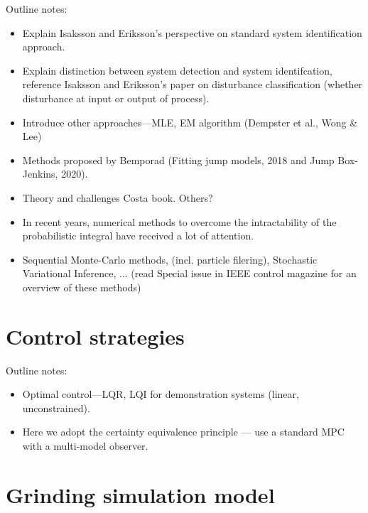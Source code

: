Outline notes:
\begin{itemize}
	\item Explain Isaksson and Eriksson's perspective on standard system identification approach.
	\item Explain distinction between system detection and system identifcation, reference Isaksson and Eriksson's paper on disturbance classification (whether disturbance at input or output of process).
	\item Introduce other approaches—MLE, EM algorithm (Dempster et al., Wong \& Lee)
	\item Methods proposed by Bemporad (Fitting jump models, 2018 and Jump Box-Jenkins, 2020).
	\item Theory and challenges Costa book. Others?
	\item In recent years, numerical methods to overcome the intractability of the probabilistic integral have received a lot of attention.
	\item Sequential Monte-Carlo methods, (incl. particle filering), Stochastic Variational Inference, ... (read Special issue in IEEE control magazine for an overview of these methods)
\end{itemize}


\section{Control strategies}

Outline notes:
\begin{itemize}
	\item Optimal control—LQR, LQI for demonstration systems (linear, unconstrained).
	\item Here we adopt the certainty equivalence principle — use a standard MPC with a multi-model observer.
\end{itemize}

\section{Grinding simulation model}

